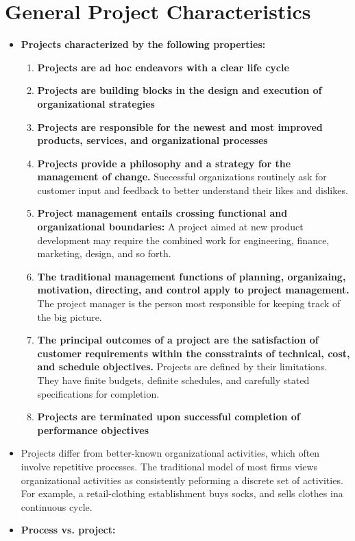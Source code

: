 \section{General Project Characteristics}
	\begin{itemize}
	\item {\bf Projects characterized by the following properties:}
		\begin{enumerate}
			\item {\bf Projects are ad hoc endeavors with a clear life cycle}
			\item {\bf Projects are building blocks in the design and execution of organizational 
			strategies}
			\item {\bf Projects are responsible for the newest and most improved products,
			services, and organizational processes}
			\item {\bf Projects provide a philosophy and a strategy for the management of change.}
			Successful organizations routinely ask for customer input and feedback to better 
			understand their likes and dislikes.
			\item {\bf Project management entails crossing functional and organizational 
			boundaries:} A project aimed at new product development may require the combined 
			work for engineering, finance, marketing, design, and so forth. 
			\item {\bf The traditional management functions of planning, organizaing, motivation, 
			directing, and control apply to project management.} The project manager is the 
			person most responsible for keeping track of the big picture.  
			\item {\bf The principal outcomes of a project are the satisfaction of customer
			requirements within the consstraints of technical, cost, and schedule objectives.}
			Projects are defined by their limitations. They have finite budgets, definite
			schedules, and carefully stated specifications for completion.
			\item {\bf Projects are terminated upon successful completion of performance
			objectives}
		\end{enumerate}
	\item Projects differ from better-known organizational activities, which often involve 
	repetitive processes. The traditional model of most firms views organizational activities
	as consistently peforming a discrete set of activities. For example, a retail-clothing 
	establishment buys socks, and sells clothes ina continuous cycle. 
	\item {\bf Process vs. project:}

\end{itemize}
